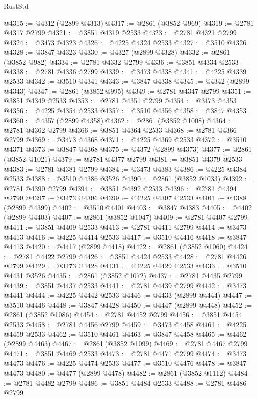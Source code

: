 \begin{lexlean}{RustStd}
\begin{coremodule}
@4315 := @4312 (@2899 @4313)
@4317 := @2861 (@3852 @969)
@4319 := @2781 @4317 @2799
@4321 := @3851 @4319 @2533
@4323 := @2781 @4321 @2799
@4324 := @3473 @4323
@4326 := @4225 @4324 @2533
@4327 := @3510 @4326
@4328 := @3847 @4323
@4330 := @4327 (@2899 @4328)
@4332 := @2861 (@3852 @982)
@4334 := @2781 @4332 @2799
@4336 := @3851 @4334 @2533
@4338 := @2781 @4336 @2799
@4339 := @3473 @4338
@4341 := @4225 @4339 @2533
@4342 := @3510 @4341
@4343 := @3847 @4338
@4345 := @4342 (@2899 @4343)
@4347 := @2861 (@3852 @995)
@4349 := @2781 @4347 @2799
@4351 := @3851 @4349 @2533
@4353 := @2781 @4351 @2799
@4354 := @3473 @4353
@4356 := @4225 @4354 @2533
@4357 := @3510 @4356
@4358 := @3847 @4353
@4360 := @4357 (@2899 @4358)
@4362 := @2861 (@3852 @1008)
@4364 := @2781 @4362 @2799
@4366 := @3851 @4364 @2533
@4368 := @2781 @4366 @2799
@4369 := @3473 @4368
@4371 := @4225 @4369 @2533
@4372 := @3510 @4371
@4373 := @3847 @4368
@4375 := @4372 (@2899 @4373)
@4377 := @2861 (@3852 @1021)
@4379 := @2781 @4377 @2799
@4381 := @3851 @4379 @2533
@4383 := @2781 @4381 @2799
@4384 := @3473 @4383
@4386 := @4225 @4384 @2533
@4388 := @3510 @4386 @3526
@4390 := @2861 (@3852 @1033)
@4392 := @2781 @4390 @2799
@4394 := @3851 @4392 @2533
@4396 := @2781 @4394 @2799
@4397 := @3473 @4396
@4399 := @4225 @4397 @2533
@4401 := @4388 (@2899 @4399)
@4402 := @3510 @4401
@4403 := @3847 @4383
@4405 := @4402 (@2899 @4403)
@4407 := @2861 (@3852 @1047)
@4409 := @2781 @4407 @2799
@4411 := @3851 @4409 @2533
@4413 := @2781 @4411 @2799
@4414 := @3473 @4413
@4416 := @4225 @4414 @2533
@4417 := @3510 @4416
@4418 := @3847 @4413
@4420 := @4417 (@2899 @4418)
@4422 := @2861 (@3852 @1060)
@4424 := @2781 @4422 @2799
@4426 := @3851 @4424 @2533
@4428 := @2781 @4426 @2799
@4429 := @3473 @4428
@4431 := @4225 @4429 @2533
@4433 := @3510 @4431 @3526
@4435 := @2861 (@3852 @1072)
@4437 := @2781 @4435 @2799
@4439 := @3851 @4437 @2533
@4441 := @2781 @4439 @2799
@4442 := @3473 @4441
@4444 := @4225 @4442 @2533
@4446 := @4433 (@2899 @4444)
@4447 := @3510 @4446
@4448 := @3847 @4428
@4450 := @4447 (@2899 @4448)
@4452 := @2861 (@3852 @1086)
@4454 := @2781 @4452 @2799
@4456 := @3851 @4454 @2533
@4458 := @2781 @4456 @2799
@4459 := @3473 @4458
@4461 := @4225 @4459 @2533
@4462 := @3510 @4461
@4463 := @3847 @4458
@4465 := @4462 (@2899 @4463)
@4467 := @2861 (@3852 @1099)
@4469 := @2781 @4467 @2799
@4471 := @3851 @4469 @2533
@4473 := @2781 @4471 @2799
@4474 := @3473 @4473
@4476 := @4225 @4474 @2533
@4477 := @3510 @4476
@4478 := @3847 @4473
@4480 := @4477 (@2899 @4478)
@4482 := @2861 (@3852 @1112)
@4484 := @2781 @4482 @2799
@4486 := @3851 @4484 @2533
@4488 := @2781 @4486 @2799

\end{coremodule}
\end{lexlean}
